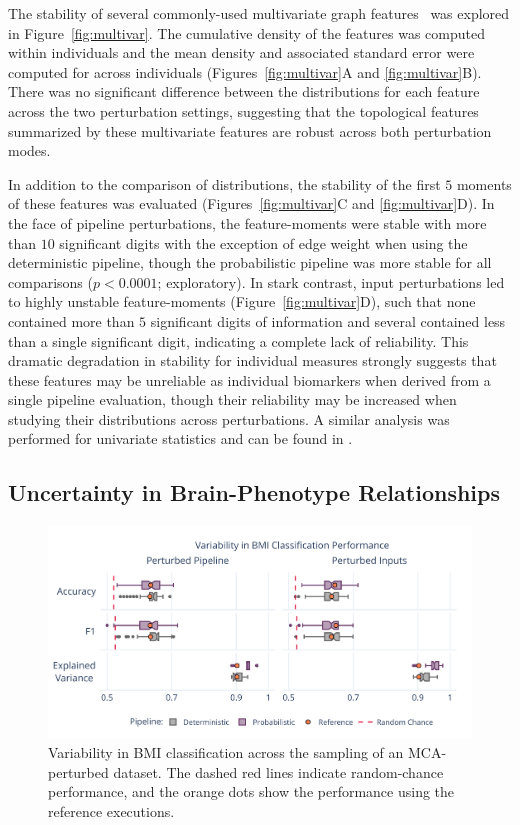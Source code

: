 \documentclass[fleqn,10pt]{SelfArx} %
\begin{document}
The stability of several commonly-used multivariate graph features~\cite{Betzel2018-eo} was explored in
Figure~\ref{fig:multivar}. The cumulative density of the features was computed within individuals and the mean
density and associated standard error were computed for across individuals (Figures~\ref{fig:multivar}A and
\ref{fig:multivar}B). There was no significant difference between the distributions for each feature across the two
perturbation settings, suggesting that the topological features summarized by these multivariate features are robust
across both perturbation modes.

In addition to the comparison of distributions, the stability of the first $5$ moments of these features was evaluated
(Figures~\ref{fig:multivar}C and \ref{fig:multivar}D). In the face of pipeline perturbations, the feature-moments were
stable with more than $10$ significant digits with the exception of edge weight when using the deterministic pipeline,
though the probabilistic pipeline was more stable for all comparisons ($p < 0.0001$; exploratory). In stark contrast,
input perturbations led to highly unstable feature-moments (Figure~\ref{fig:multivar}D), such that none contained more
than $5$ significant digits of information and several contained less than a single significant digit, indicating a
complete lack of reliability. This dramatic degradation in stability for individual measures strongly suggests that
these features may be unreliable as individual biomarkers when derived from a single pipeline evaluation, though their
reliability may be increased when studying their distributions across perturbations. A similar analysis was performed
for univariate statistics and can be found in .

\subsection*{Uncertainty in Brain-Phenotype Relationships}

\begin{figure}[ht]\centering
\includegraphics[width=0.7\linewidth]{figures/fig3_bmi_classification.pdf}
\caption{Variability in BMI classification across the sampling of an MCA-perturbed dataset. The dashed red lines
indicate random-chance performance, and the orange dots show the performance using the reference executions.}
\label{fig:bmi}
\end{figure}
 
\end{document}
